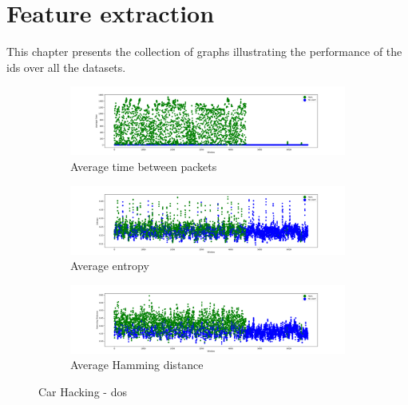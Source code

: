 \chapter{Feature extraction}
\label{apdx:sec:feature_extraction}

This chapter presents the collection of graphs illustrating the performance of the \gls{ids} over all the datasets.

\begin{figure}
    \centering
    \begin{subfigure}[b]{\linewidth}
        \includegraphics[width = \linewidth]{img/parts/app/tests/car_hacking/DoS/AvgTime.png}
        \caption{Average time between packets}
        \label{subfig:extract_carhacking_dos_avgtime}
    \end{subfigure}
    \begin{subfigure}[b]{\linewidth}
        \includegraphics[width = \linewidth]{img/parts/app/tests/car_hacking/DoS/Entropy.png}
        \caption{Average entropy}
        \label{subfig:extract_carhacking_dos_entropy}
    \end{subfigure}
    \begin{subfigure}[b]{\linewidth}
        \includegraphics[width = \linewidth]{img/parts/app/tests/car_hacking/DoS/HammingDist.png}
        \caption{Average Hamming distance}
        \label{subfig:extract_carhacking_dos_hammingdist}
    \end{subfigure}
    \caption{Car Hacking - \gls{dos}}
    \label{fig:extract_carhacking_dos}
\end{figure}

